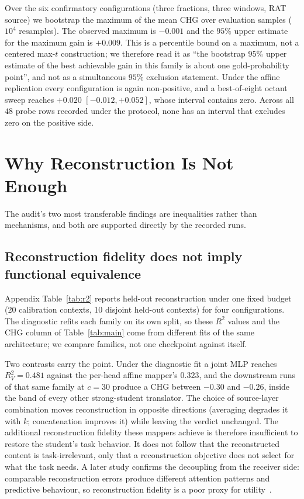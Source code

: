 \documentclass[10pt]{article}
\begin{document}
Over the six confirmatory configurations (three fractions, three windows, RAT
source) we bootstrap the maximum of the mean CHG over evaluation samples
($10^4$ resamples). The observed maximum is $-0.001$ and the $95\%$ upper
estimate for the maximum gain is $+0.009$. This is a percentile bound on a
maximum, not a centered max-$t$ construction; we therefore read it as
``the bootstrap $95\%$ upper estimate of the best achievable gain in this family
is about one gold-probability point'', and not as a simultaneous $95\%$
exclusion statement. Under the affine replication every configuration is again
non-positive, and a best-of-eight octant sweep reaches $+0.020$
$[-0.012,+0.052]$, whose interval contains zero. Across all $48$ probe rows
recorded under the protocol, none has an interval that excludes zero on the
positive side.


\section{Why Reconstruction Is Not Enough}
\label{sec:analysis}

The audit's two most transferable findings are inequalities rather than
mechanisms, and both are supported directly by the recorded runs.

\subsection{Reconstruction fidelity does not imply functional equivalence}
Appendix Table~\ref{tab:r2} reports held-out reconstruction under one fixed
budget (20 calibration contexts, 10 disjoint held-out contexts) for four
configurations. The diagnostic refits each family on its own split, so these
$R^2$ values and the CHG column of Table~\ref{tab:main} come from different fits
of the same architecture; we compare families, not one checkpoint against
itself.

Two contrasts carry the point. Under the diagnostic fit a joint MLP reaches
$R^2_V = 0.481$ against the per-head affine mapper's $0.323$, and the downstream
runs of that same family at $c{=}30$ produce a CHG between $-0.30$ and $-0.26$,
inside the band of every other strong-student translator. The choice of
source-layer combination moves reconstruction in opposite directions (averaging
degrades it with $k$; concatenation improves it) while leaving the verdict
unchanged. The additional reconstruction fidelity these mappers achieve is
therefore insufficient to restore the student's task behavior. It does not
follow that the reconstructed content is task-irrelevant, only that a
reconstruction objective does not select for what the task needs. A later study
confirms the
decoupling from the receiver side: comparable reconstruction errors produce
different attention patterns and predictive behaviour, so reconstruction
fidelity is a poor proxy for utility~\citep{cachelink2026}.
\end{document}
